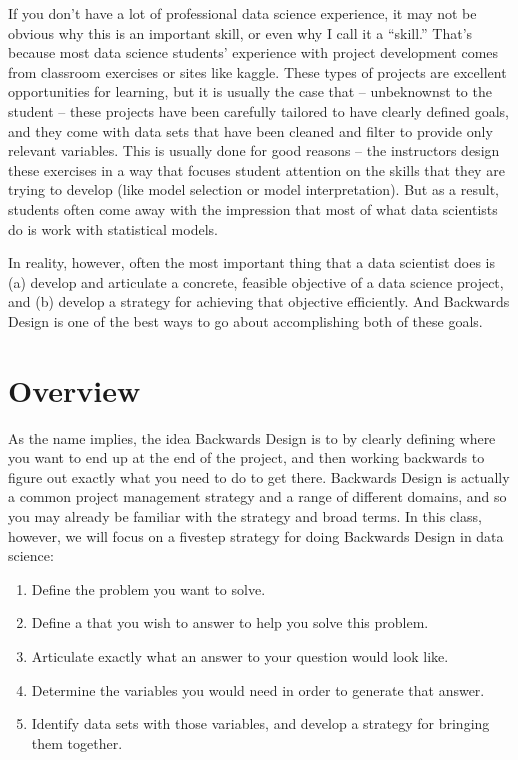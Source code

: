 \documentclass[letterpaper,10pt,english]{jupyterBook}
\begin{document}
\sphinxAtStartPar
If you don’t have a lot of professional data science experience, it may not be obvious why this is an important skill, or even why I call it a “skill.” That’s because most data science students’ experience with project development comes from classroom exercises or sites like kaggle. These types of projects are excellent opportunities for learning, but it is usually the case that – unbeknownst to the student – these projects have been carefully tailored to have clearly defined goals, and they come with data sets that have been cleaned and filter to provide only relevant variables. This is usually done for good reasons – the instructors design these exercises in a way that focuses student attention on the skills that they are trying to develop (like model selection or model interpretation). But as a result, students often come away with the impression that most of what data scientists do is work with statistical models.

\sphinxAtStartPar
In reality, however, often the most important thing that a data scientist does is (a) develop and articulate a concrete, feasible objective of a data science project, and (b) develop a strategy for achieving that objective efficiently. And Backwards Design is one of the best ways to go about accomplishing both of these goals.


\section{Overview}
\label{\detokenize{40_in_practice/05_backwards_design:overview}}
\sphinxAtStartPar
As the name implies, the idea Backwards Design is to  by clearly defining where you want to end up at the end of the project, and then working backwards to figure out exactly what you need to do to get there. Backwards Design is actually a common project management strategy and a range of different domains, and so you may already be familiar with the strategy and broad terms. In this class, however, we will focus on a five\sphinxhyphen{}step strategy for doing Backwards Design in data science:
\begin{enumerate}
%
\item {} 
\sphinxAtStartPar
Define the problem you want to solve.

\item {} 
\sphinxAtStartPar
Define a  that you wish to answer to help you solve this problem.

\item {} 
\sphinxAtStartPar
Articulate exactly what an answer to your question would look like.

\item {} 
\sphinxAtStartPar
Determine the variables you would need in order to generate that answer.

\item {} 
\sphinxAtStartPar
Identify data sets with those variables, and develop a strategy for bringing them together.

\end{enumerate}
\end{document}
